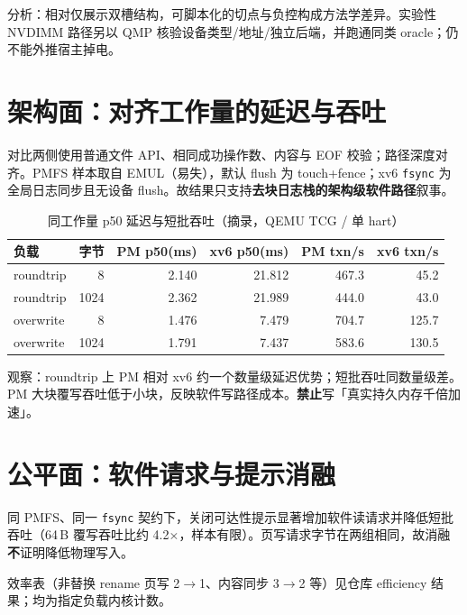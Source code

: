 分析：相对仅展示双槽结构，可脚本化的切点与负控构成方法学差异。实验性 NVDIMM 路径另以 QMP 核验设备类型/地址/独立后端，并跑通同类 oracle；仍不能外推宿主掉电。

\section{架构面：对齐工作量的延迟与吞吐}

对比两侧使用普通文件 API、相同成功操作数、内容与 EOF 校验；路径深度对齐。PMFS 样本取自 EMUL（易失），默认 flush 为 touch+fence；xv6 \texttt{fsync} 为全局日志同步且无设备 flush。故结果只支持\textbf{去块日志栈的架构级软件路径}叙事。

\begin{table}[htbp]
  \centering
  \caption{同工作量 p50 延迟与短批吞吐（摘录，QEMU TCG / 单 hart）}
  \label{tab:matched}
  \begin{tabular}{lrrrrr}
    \toprule
    负载 & 字节 & PM p50(ms) & xv6 p50(ms) & PM txn/s & xv6 txn/s \\
    \midrule
    roundtrip & 8    & 2.140 & 21.812 & 467.3 & 45.2 \\
    roundtrip & 1024 & 2.362 & 21.989 & 444.0 & 43.0 \\
    overwrite & 8    & 1.476 & 7.479  & 704.7 & 125.7 \\
    overwrite & 1024 & 1.791 & 7.437  & 583.6 & 130.5 \\
    \bottomrule
  \end{tabular}
\end{table}

\FigNLatency

\FigWaN

观察：roundtrip 上 PM 相对 xv6 约一个数量级延迟优势；短批吞吐同数量级差。PM 大块覆写吞吐低于小块，反映软件写路径成本。\textbf{禁止}写「真实持久内存千倍加速」。

\section{公平面：软件请求与提示消融}

同 PMFS、同一 \texttt{fsync} 契约下，关闭可达性提示显著增加软件读请求并降低短批吞吐（64\,B 覆写吞吐比约 4.2$\times$，样本有限）。页写请求字节在两组相同，故消融\textbf{不}证明降低物理写入。

\FigMapEmul

\FigThr

效率表（非替换 rename 页写 2$\rightarrow$1、内容同步 3$\rightarrow$2 等）见仓库 efficiency 结果；均为指定负载内核计数。

